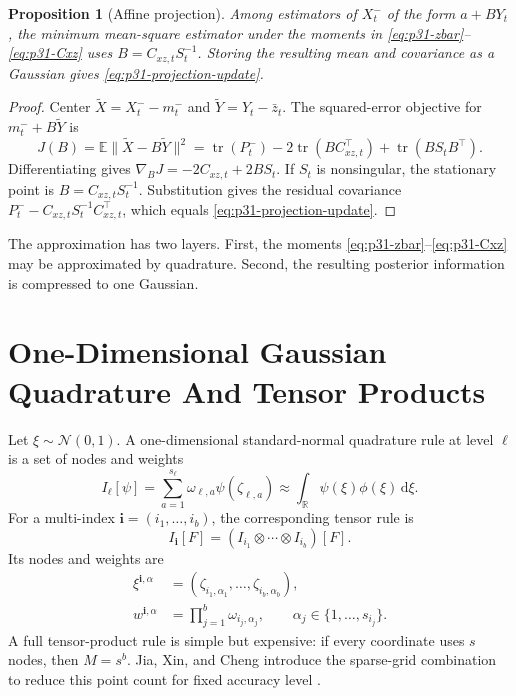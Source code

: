 \documentclass[11pt]{article}
\newtheorem{proposition}{Proposition}
\numberwithin{equation}{section}
\newcommand{\R}{\mathbb R}
\newcommand{\E}{\mathbb E}
\newcommand{\N}{\mathcal N}
\newcommand{\dd}{\,\mathrm d}
\newcommand{\tr}{\operatorname{tr}}
\begin{document}
\begin{proposition}[Affine projection]
\label{prop:p31-affine-projection}
Among estimators of \(X_t^-\) of the form \(a+B Y_t\), the minimum mean-square
estimator under the moments in
\eqref{eq:p31-zbar}--\eqref{eq:p31-Cxz} uses \(B=C_{xz,t}S_t^{-1}\).  Storing
the resulting mean and covariance as a Gaussian gives
\eqref{eq:p31-projection-update}.
\end{proposition}

\begin{proof}
Center \(\widetilde X=X_t^- -m_t^-\) and
\(\widetilde Y=Y_t-\bar z_t\).  The squared-error objective for
\(m_t^-+B\widetilde Y\) is
\begin{equation}
  J(B)=\E\|\widetilde X-B\widetilde Y\|^2
  =
  \tr(P_t^-)-2\tr(BC_{xz,t}^\top)+\tr(BS_tB^\top).
  \label{eq:p31-affine-objective}
\end{equation}
Differentiating gives \(\nabla_BJ=-2C_{xz,t}+2BS_t\).  If \(S_t\) is
nonsingular, the stationary point is \(B=C_{xz,t}S_t^{-1}\).  Substitution gives
the residual covariance \(P_t^- - C_{xz,t}S_t^{-1}C_{xz,t}^\top\), which equals
\eqref{eq:p31-projection-update}.
\end{proof}

The approximation has two layers.  First, the moments
\eqref{eq:p31-zbar}--\eqref{eq:p31-Cxz} may be approximated by quadrature.
Second, the resulting posterior information is compressed to one Gaussian.

\section{One-Dimensional Gaussian Quadrature And Tensor Products}
\label{sec:p31-ghq}

Let \(\xi\sim\N(0,1)\).  A one-dimensional standard-normal quadrature rule at
level \(\ell\) is a set of nodes and weights
\begin{equation}
  I_\ell[\psi]
  =
  \sum_{a=1}^{s_\ell}\omega_{\ell,a}\psi(\zeta_{\ell,a})
  \approx
  \int_{\R}\psi(\xi)\phi(\xi)\dd \xi.
  \label{eq:p31-univariate-rule}
\end{equation}
For a multi-index \(\mathbf i=(i_1,\ldots,i_b)\), the corresponding tensor rule
is
\begin{equation}
  I_{\mathbf i}[F]
  =
  (I_{i_1}\otimes\cdots\otimes I_{i_b})[F].
  \label{eq:p31-tensor-rule}
\end{equation}
Its nodes and weights are
\begin{align}
  \xi^{\mathbf i,\alpha}
  &=
  (\zeta_{i_1,\alpha_1},\ldots,\zeta_{i_b,\alpha_b}),
  \label{eq:p31-tensor-node}\\
  w^{\mathbf i,\alpha}
  &=
  \prod_{j=1}^b\omega_{i_j,\alpha_j},
  \qquad
  \alpha_j\in\{1,\ldots,s_{i_j}\}.
  \label{eq:p31-tensor-weight}
\end{align}
A full tensor-product rule is simple but expensive: if every coordinate uses
\(s\) nodes, then \(M=s^b\).  Jia, Xin, and Cheng introduce the sparse-grid
combination to reduce this point count for fixed accuracy level
\cite[Section 3]{jia2012sparsegrid}.
\end{document}
